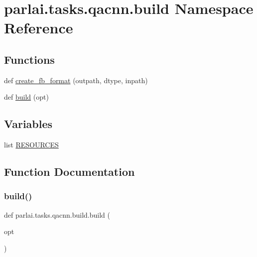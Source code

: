 \hypertarget{namespaceparlai_1_1tasks_1_1qacnn_1_1build}{}\section{parlai.\+tasks.\+qacnn.\+build Namespace Reference}
\label{namespaceparlai_1_1tasks_1_1qacnn_1_1build}
\subsection*{Functions}
\begin{DoxyCompactItemize}
\item 
def \hyperlink{namespaceparlai_1_1tasks_1_1qacnn_1_1build_add8d5f440ef973d77d8f63cc11197dce}{create\+\_\+fb\+\_\+format} (outpath, dtype, inpath)
\item 
def \hyperlink{namespaceparlai_1_1tasks_1_1qacnn_1_1build_a75d46e5e4248f77e7a6b83c7038144fa}{build} (opt)
\end{DoxyCompactItemize}
\subsection*{Variables}
\begin{DoxyCompactItemize}
\item 
list \hyperlink{namespaceparlai_1_1tasks_1_1qacnn_1_1build_aa5fbabbd9a51f4ecafc2a7da3ee8c130}{R\+E\+S\+O\+U\+R\+C\+ES}
\end{DoxyCompactItemize}


\subsection{Function Documentation}
\mbox{\label{namespaceparlai_1_1tasks_1_1qacnn_1_1build_a75d46e5e4248f77e7a6b83c7038144fa}} 
\subsubsection{\texorpdfstring{build()}{build()}}
{\footnotesize\ttfamily def parlai.\+tasks.\+qacnn.\+build.\+build (\begin{DoxyParamCaption}\item[{}]{opt }\end{DoxyParamCaption})}

